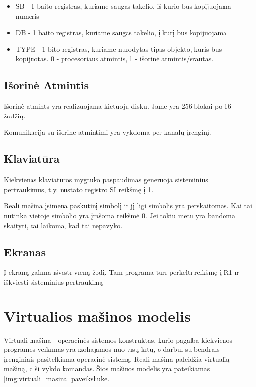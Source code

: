 \documentclass{VUMIFInfKursinis}
\begin{document}
\begin{itemize}
	\item SB - 1 baito registras, kuriame saugas takelio, iš kurio bus kopijuojama numeris
	\item DB - 1 baito registras, kuriame saugas takelio, į kurį bus kopijuojama
	\item TYPE - 1 bito registras, kuriame nurodytas tipas objekto, kuris bus kopijuotas. 0 - procesoriaus atmintis, 1 - išorinė atmintis/srautas.
\end{itemize}

\subsection{Išorinė Atmintis}

Išorinė atmints yra realizuojama kietuoju disku. Jame yra 256 blokai po 16 žodžių.

Komunikacija su išorine atmintimi yra vykdoma per kanalų įrenginį.

\subsection{Klaviatūra}

Kiekvienas klaviatūros mygtuko paspaudimas generuoja sisteminius pertraukimus, t.y. nustato registro SI reikšmę į 1. 

Reali mašina įsimena paskutinį simbolį ir jį ligi simbolis yra perskaitomas. Kai tai nutinka vietoje simbolio yra įrašoma reikšmė 0. Jei tokiu metu yra bandoma skaityti, tai laikoma, kad tai nepavyko.

\subsection{Ekranas}

Į ekraną galima išvesti vieną žodį. Tam programa turi perkelti reikšmę į R1 ir iškviesti sisteminius pertraukimą

\section{Virtualios mašinos modelis}

Virtuali mašina - operacinės sistemos konstruktas, kurio pagalba kiekvienos programos veikimas yra izoliajamos nuo visų kitų, o darbui su bendrais įrenginiais pasitelkiama operacinė sistemą. Reali mašina paleidžia virtualią mašiną, o ši vykdo komandas. Šios mašinos modelis yra pateikiamas \ref{img:virtuali_masina} paveiksliuke.
\end{document}

